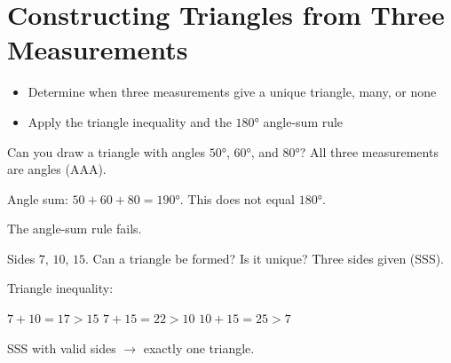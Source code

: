 \section{Constructing Triangles from Three Measurements}

\begin{stepGoal}
\begin{itemize}
    \item Determine when three measurements give a unique triangle, many, or none
    \item Apply the triangle inequality and the $180°$ angle-sum rule
\end{itemize}
\end{stepGoal}

\begin{stepVocabBox}
\end{stepVocabBox}

\begin{stepsCard}
\end{stepsCard}

\begin{stepExample}{Can you draw a triangle with angles $50°$, $60°$, and $80°$?}
     All three measurements are angles (AAA).

     Angle sum: $50 + 60 + 80 = 190°$. This does not equal $180°$.

     The angle-sum rule fails.
\end{stepExample}

\begin{stepExample}{Sides $7$, $10$, $15$. Can a triangle be formed? Is it unique?}
     Three sides given (SSS).

     Triangle inequality:\par
    $7 + 10 = 17 > 15$ \checkmark \quad $7 + 15 = 22 > 10$ \checkmark \quad $10 + 15 = 25 > 7$ \checkmark

     SSS with valid sides $\to$ exactly one triangle.
\end{stepExample}

